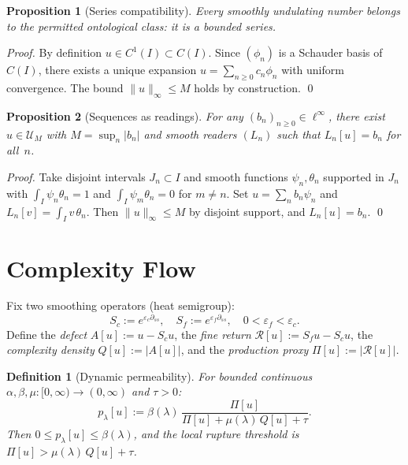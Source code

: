 \documentclass[11pt,a4paper]{article}
\newtheorem{definition}{Definition}
\newtheorem{proposition}{Proposition}
\newcommand{\UM}{\mathcal{U}_M}
\begin{document}
\begin{proposition}[Series compatibility]
\label{prop:series}
Every smoothly undulating number belongs to the permitted ontological
class: it is a bounded series.
\end{proposition}
\begin{proof}
By definition $u \in C^1(I) \subset C(I)$. Since $(\phi_n)$ is a
Schauder basis of $C(I)$, there exists a unique expansion
$u = \sum_{n\ge0} c_n \phi_n$ with uniform convergence.
The bound $\|u\|_\infty \le M$ holds by construction. \qed
\end{proof}

\begin{proposition}[Sequences as readings]
\label{prop:sequences}
For any $(b_n)_{n\ge0} \in \ell^\infty$, there exist
$u \in \UM$ with $M = \sup_n|b_n|$ and smooth readers $(L_n)$
such that $L_n[u] = b_n$ for all~$n$.
\end{proposition}
\begin{proof}
Take disjoint intervals $J_n \subset I$ and smooth functions
$\psi_n, \theta_n$ supported in $J_n$ with
$\int_I \psi_n\theta_n = 1$ and $\int_I \psi_m\theta_n = 0$ for $m \ne n$.
Set $u = \sum_n b_n\psi_n$ and $L_n[v] = \int_I v\,\theta_n$.
Then $\|u\|_\infty \le M$ by disjoint support, and $L_n[u] = b_n$. \qed
\end{proof}

\section{Complexity Flow}

Fix two smoothing operators (heat semigroup):
\[
S_c := e^{\varepsilon_c\partial_{ss}}, \quad
S_f := e^{\varepsilon_f\partial_{ss}}, \quad
0 < \varepsilon_f < \varepsilon_c.
\]
Define the \emph{defect} $A[u] := u - S_c u$,
the \emph{fine return} $\mathcal{R}[u] := S_f u - S_c u$,
the \emph{complexity density} $Q[u] := |A[u]|$,
and the \emph{production proxy} $\Pi[u] := |\mathcal{R}[u]|$.

\begin{definition}[Dynamic permeability]
\label{def:perm}
For bounded continuous $\alpha,\beta,\mu: [0,\infty) \to (0,\infty)$
and $\tau > 0$:
\begin{equation}\label{eq:B1}
p_\lambda[u] := \beta(\lambda)\,
\frac{\Pi[u]}{\Pi[u] + \mu(\lambda)\,Q[u] + \tau}. \tag{B1}
\end{equation}
Then $0 \le p_\lambda[u] \le \beta(\lambda)$, and the local
rupture threshold is $\Pi[u] > \mu(\lambda)\,Q[u] + \tau$.
\end{definition}
\end{document}
